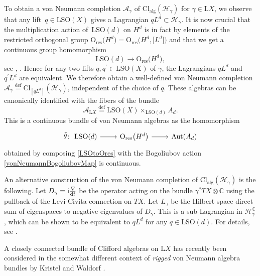 \documentclass[pdftex]{sigma}
\numberwithin{equation}{section}
\newcommand{\C}{\mathbb{C}}
\newcommand{\A}{\mathcal{A}}
\newcommand{\Cl}{\mathrm{Cl}}
\newcommand{\SO}{\mathrm{SO}}
\newcommand{\res}{\mathrm{res}}
\newcommand{\Aut}{\mathrm{Aut}}
\renewcommand{\O}{\mathrm{O}}
\renewcommand{\L}{\mathrm{L}}
\newcommand{\defeq}{\stackrel{\mathrm{def}}{=}}
\begin{document}
To obtain a von Neumann completion $\A_\gamma$ of $\Cl_{\mathrm{alg}}(\mathcal{H}_\gamma)$ for $\gamma \in \L X$, we observe that any lift~${q \in \L \SO(X)}$ gives a Lagrangian $q L^d \subset \mathcal{H}_\gamma$.
It is now crucial that the multiplication action of~$\L\SO(d)$ on $H^d$ is in fact by elements of the restricted orthogonal group $\O_{\res}\big(H^d\big) = \O_{\res}\big(H^d, \big[L^d\big]\big)$ and that we get a continuous group homomorphism
\begin{equation} \label{LSOtoOres}
 \L\SO(d) \longrightarrow \O_{\res}\big(H^d\big),
\end{equation}
see \cite[Proposition~6.3.1]{PressleySegal}, \cite[Proposition~3.23]{KristelWaldorf1}.
Hence for any two lifts $q, q^\prime \in \L \SO(X)$ of $\gamma$, the Lagrangians $q L^d$ and $q^\prime L^d$ are equivalent.
We therefore obtain a well-defined von Neumann completion $\A_\gamma \defeq \Cl_{[q L^d]}(\mathcal{H}_\gamma)$, independent of the choice of $q$.
These algebras can be canonically identified with the fibers of the bundle
\begin{equation} \label{vNBundleAsAssociatedBundle}
 \A_{\L X} \defeq \L \SO(X) \times_{\L\SO(d)} A_d.
\end{equation}
This is a continuous bundle of von Neumann algebras as the homomorphism
\begin{equation} \label{ThetaTilde}
\begin{tikzcd}
\tilde{\theta}\colon \ \L \SO(d) \ar[r] & \O_{\res}\big(H^d\big) \ar[r] & \Aut(A_d)
\end{tikzcd}
\end{equation}
obtained by composing \eqref{LSOtoOres} with the Bogoliubov action \eqref{vonNeumannBogoliubovMap} is continuous.

\begin{Remark}
An alternative construction of the von Neumann completion of $\Cl_{\mathrm{alg}}(\mathcal{H}_\gamma)$ is the following.
Let $D_\gamma = \mathrm{i}\frac{\nabla}{{\rm d}t}$ be the operator acting on the bundle $\gamma^*T X \otimes \C$ using the pullback of the Levi-Civita connection on $TX$.
Let $L_\gamma$ be the Hilbert space direct sum of eigenspaces to negative eigenvalues of $D_\gamma$.
This is a sub-Lagrangian in $\mathcal{H}_\gamma^\C$, which can be shown to be equivalent to $q L^d$ for any $q \in \L\SO(d)$.
For details, see \cite[Section~1.3]{LudewigSpinorBundle}.
\end{Remark}

\begin{Remark}
A closely connected bundle of Clifford algebras on $\L X$ has recently been considered in the somewhat different context of \emph{rigged} von Neumann algebra bundles by Kristel and Waldorf \cite{KristelWaldorf2}.
\end{Remark}
\end{document}
